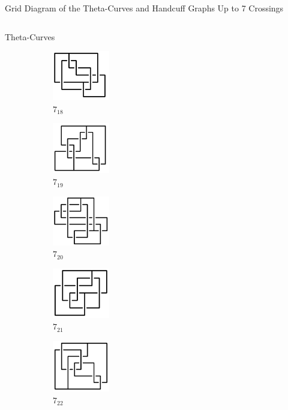 \documentclass[final]{beamer}
\begin{document}
\begin{frame}[t]
\begin{alertblock}{Grid Diagram of the Theta-Curves and Handcuff Graphs Up to 7 Crossings}
\begin{columns}[t]
\begin{column}{0.7\textwidth}
\begin{alertblock}{Theta-Curves}
\begin{figure}
    \begin{subfigure}{0.075\textwidth}
    \includegraphics[width=2.5cm]{../Midterm_Poster/grid_diagram/theta_7_18.png}
    \caption{$7_{18}$} 
    \end{subfigure}
    \begin{subfigure}{0.075\textwidth}
    \includegraphics[width=2.5cm]{../Midterm_Poster/grid_diagram/theta_7_19.png}
    \caption{$7_{19}$} 
    \end{subfigure}
    \begin{subfigure}{0.075\textwidth}
    \includegraphics[width=2.5cm]{../Midterm_Poster/grid_diagram/theta_7_20.png}
    \caption{$7_{20}$} 
    \end{subfigure}
    \begin{subfigure}{0.075\textwidth}
    \includegraphics[width=2.5cm]{../Midterm_Poster/grid_diagram/theta_7_21.png}
    \caption{$7_{21}$} 
    \end{subfigure}
    \begin{subfigure}{0.075\textwidth}
    \includegraphics[width=2.5cm]{../Midterm_Poster/grid_diagram/theta_7_22.png}
    \caption{$7_{22}$} 
    \end{subfigure}
    \begin{subfigure}{0.075\textwidth}

\end{subfigure}
\end{figure}
\end{alertblock}
\end{column}
\end{columns}
\end{alertblock}
\end{frame}
\end{document}
